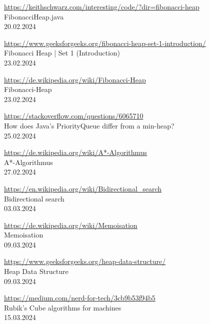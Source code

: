 \begin{thebibliography}{999}
    \href{https://keithschwarz.com/interesting/code/?dir=fibonacci-heap}{https://keithschwarz.com/interesting/code/?dir=fibonacci-heap}\\
    FibonacciHeap.java\\
    20.02.2024
    
    \href{https://www.geeksforgeeks.org/fibonacci-heap-set-1-introduction/}{https://www.geeksforgeeks.org/fibonacci-heap-set-1-introduction/}\\
    Fibonacci Heap | Set 1 (Introduction)\\
    23.02.2024

    \href{https://de.wikipedia.org/wiki/Fibonacci-Heap}{https://de.wikipedia.org/wiki/Fibonacci-Heap}\\
    Fibonacci-Heap\\
    23.02.2024

    \href{https://stackoverflow.com/questions/6065710}{https://stackoverflow.com/questions/6065710}\\
    How does Java's PriorityQueue differ from a min-heap?\\
    25.02.2024

    \href{https://de.wikipedia.org/wiki/A*-Algorithmus}{https://de.wikipedia.org/wiki/A*-Algorithmus}\\
    A*-Algorithmus\\
    27.02.2024

    \href{https://en.wikipedia.org/wiki/Bidirectional_search}{https://en.wikipedia.org/wiki/Bidirectional\_search}\\
    Bidirectional search\\
    03.03.2024

    \href{https://de.wikipedia.org/wiki/Memoisation}{https://de.wikipedia.org/wiki/Memoisation}\\
    Memoisation\\
    09.03.2024

    \href{https://www.geeksforgeeks.org/heap-data-structure/}{https://www.geeksforgeeks.org/heap-data-structure/}\\
    Heap Data Structure\\
    09.03.2024

    \href{https://medium.com/nerd-for-tech/3cb9b53f94b5}{https://medium.com/nerd-for-tech/3cb9b53f94b5}\\
    Rubik’s Cube algorithms for machines\\
    15.03.2024


\end{thebibliography}
